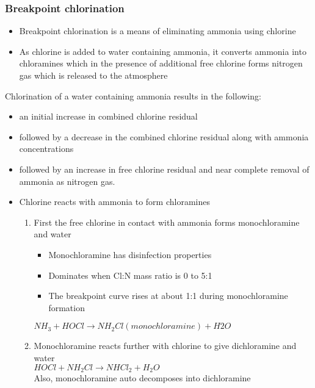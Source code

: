 \subsubsection{Breakpoint chlorination}
			\begin{itemize}
				\item Breakpoint chlorination is a means of eliminating ammonia using chlorine
				\item As chlorine is added to water containing ammonia, it converts ammonia into chloramines which in the presence of additional free chlorine forms nitrogen gas which is released to the atmosphere
			\end{itemize} 
Chlorination of a water containing ammonia results in the following:
			\begin{itemize}
				\item an initial increase in combined chlorine residual
				\item followed by a decrease in the combined chlorine residual
				along with ammonia concentrations
				\item followed by an increase in free chlorine residual and near complete removal 					of ammonia as nitrogen gas.\\
				\item Chlorine reacts with ammonia to form chloramines\\
				\begin{enumerate}
					\item First the free chlorine in contact with ammonia forms monochloramine and water
						\begin{itemize}
							\item Monochloramine has disinfection properties\\
							\item Dominates when Cl:N mass ratio is 0 to 5:1\\
							\item The breakpoint curve rises at about 1:1 during monochloramine formation\\
						\end{itemize}
					$NH_3 + HOCl   \rightarrow NH_2Cl (monochloramine) + H2O$\\
					\item Monochloramine reacts further with chlorine to give dichloramine and water\\
					$HOCl + NH_2Cl \rightarrow NHCl_2 + H_2O$\\
					Also, monochloramine auto decomposes into dichloramine\\

\end{enumerate}
\end{itemize}
